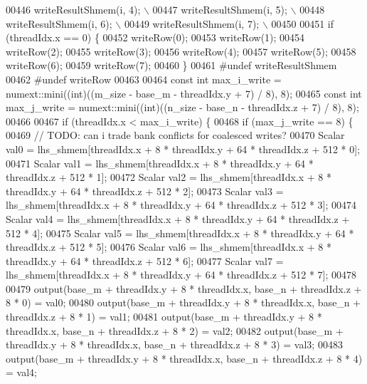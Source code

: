 \begin{DoxyCode}
00446 \textcolor{preprocessor}{  writeResultShmem(i, 4);                       \(\backslash\)}
00447 \textcolor{preprocessor}{  writeResultShmem(i, 5);                       \(\backslash\)}
00448 \textcolor{preprocessor}{  writeResultShmem(i, 6);                       \(\backslash\)}
00449 \textcolor{preprocessor}{  writeResultShmem(i, 7);                       \(\backslash\)}
00450 \textcolor{preprocessor}{}
00451   \textcolor{keywordflow}{if} (threadIdx.x == 0) \{
00452     writeRow(0);
00453     writeRow(1);
00454     writeRow(2);
00455     writeRow(3);
00456     writeRow(4);
00457     writeRow(5);
00458     writeRow(6);
00459     writeRow(7);
00460   \}
00461 \textcolor{preprocessor}{#undef writeResultShmem}
00462 \textcolor{preprocessor}{#undef writeRow}
00463 
00464   \textcolor{keyword}{const} \textcolor{keywordtype}{int} max\_i\_write = numext::mini((\textcolor{keywordtype}{int})((m\_size - base\_m - threadIdx.y + 7) / 8), 8);
00465   \textcolor{keyword}{const} \textcolor{keywordtype}{int} max\_j\_write = numext::mini((\textcolor{keywordtype}{int})((n\_size - base\_n - threadIdx.z + 7) / 8), 8);
00466 
00467   \textcolor{keywordflow}{if} (threadIdx.x < max\_i\_write) \{
00468     \textcolor{keywordflow}{if} (max\_j\_write == 8) \{
00469       \textcolor{comment}{// TODO: can i trade bank conflicts for coalesced writes?}
00470       Scalar val0 = lhs\_shmem[threadIdx.x + 8 * threadIdx.y + 64 * threadIdx.z + 512 * 0];
00471       Scalar val1 = lhs\_shmem[threadIdx.x + 8 * threadIdx.y + 64 * threadIdx.z + 512 * 1];
00472       Scalar val2 = lhs\_shmem[threadIdx.x + 8 * threadIdx.y + 64 * threadIdx.z + 512 * 2];
00473       Scalar val3 = lhs\_shmem[threadIdx.x + 8 * threadIdx.y + 64 * threadIdx.z + 512 * 3];
00474       Scalar val4 = lhs\_shmem[threadIdx.x + 8 * threadIdx.y + 64 * threadIdx.z + 512 * 4];
00475       Scalar val5 = lhs\_shmem[threadIdx.x + 8 * threadIdx.y + 64 * threadIdx.z + 512 * 5];
00476       Scalar val6 = lhs\_shmem[threadIdx.x + 8 * threadIdx.y + 64 * threadIdx.z + 512 * 6];
00477       Scalar val7 = lhs\_shmem[threadIdx.x + 8 * threadIdx.y + 64 * threadIdx.z + 512 * 7];
00478 
00479       output(base\_m + threadIdx.y + 8 * threadIdx.x, base\_n + threadIdx.z + 8 * 0) = val0;
00480       output(base\_m + threadIdx.y + 8 * threadIdx.x, base\_n + threadIdx.z + 8 * 1) = val1;
00481       output(base\_m + threadIdx.y + 8 * threadIdx.x, base\_n + threadIdx.z + 8 * 2) = val2;
00482       output(base\_m + threadIdx.y + 8 * threadIdx.x, base\_n + threadIdx.z + 8 * 3) = val3;
00483       output(base\_m + threadIdx.y + 8 * threadIdx.x, base\_n + threadIdx.z + 8 * 4) = val4;

\end{DoxyCode}
